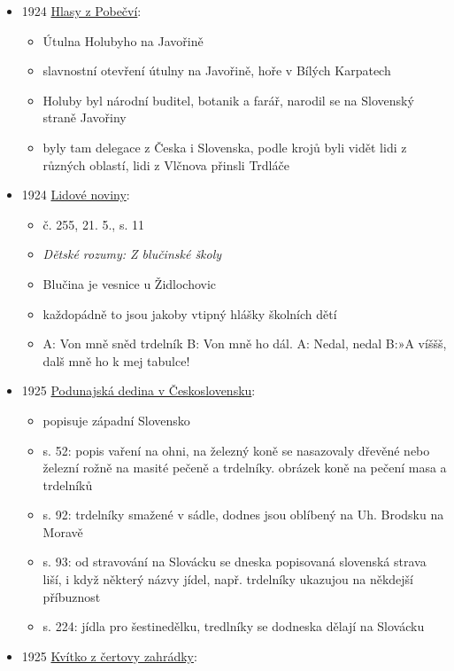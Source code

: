 \begin{itemize}
  \begin{itemize}
  \tightlist
  \item
    s. 6, popis svatby, hosti jedli spoustu jídel, například trdelníky,
    koláče, boží milosti
  \end{itemize}
\item
  1924
  \href{https://www.digitalniknihovna.cz/vkol/uuid/uuid:6d0b5583-d938-4159-bc14-63387259d2c7}{Hlasy
  z Pobečví}:

  \begin{itemize}
  \tightlist
  \item
    Útulna Holubyho na Javořině
  \item
    slavnostní otevření útulny na Javořině, hoře v Bílých Karpatech
  \item
    Holuby byl národní buditel, botanik a farář, narodil se na Slovenský
    straně Javořiny
  \item
    byly tam delegace z Česka i Slovenska, podle krojů byli vidět lidi z
    různých oblastí, lidi z Vlčnova přinsli Trdláče
  \end{itemize}
\item
  1924
  \href{https://www.digitalniknihovna.cz/vkol/uuid/uuid:274b92a0-86e1-11dc-abc7-000d606f5dc6}{Lidové
  noviny}:

  \begin{itemize}
  \tightlist
  \item
    č. 255, 21. 5., s. 11
  \item
    \emph{Dětské rozumy: Z blučinské školy}
  \item
    Blučina je vesnice u Židlochovic
  \item
    každopádně to jsou jakoby vtipný hlášky školních dětí
  \item
    A: Von mně sněd trdelník B: Von mně ho dál. A: Nedal, nedal B:»A
    víššš, dalš mně ho k mej tabulce!
  \end{itemize}
\item
  1925
  \href{https://www.digitalniknihovna.cz/nulk/uuid/uuid:b2d75327-ce5f-4248-8ec5-52b0f9b2f9af}{Podunajská
  dedina v Československu}:

  \begin{itemize}
  \tightlist
  \item
    popisuje západní Slovensko
  \item
    s. 52: popis vaření na ohni, na železný koně se nasazovaly dřevěné
    nebo železní rožně na masité pečeně a trdelníky. obrázek koně na
    pečení masa a trdelníků
  \item
    s. 92: trdelníky smažené v sádle, dodnes jsou oblíbený na Uh.
    Brodsku na Moravě
  \item
    s. 93: od stravování na Slovácku se dneska popisovaná slovenská
    strava liší, i když některý názvy jídel, např. trdelníky ukazujou na
    někdejší příbuznost
  \item
    s. 224: jídla pro šestinedělku, tredlníky se dodneska dělají na
    Slovácku
  \end{itemize}
\item
  1925
  \href{https://ceskadigitalniknihovna.cz/uuid/uuid:f9d7dc50-c0ec-4cbb-ace5-c60d24598488}{Kvítko
  z čertovy zahrádky}:


\end{itemize}
